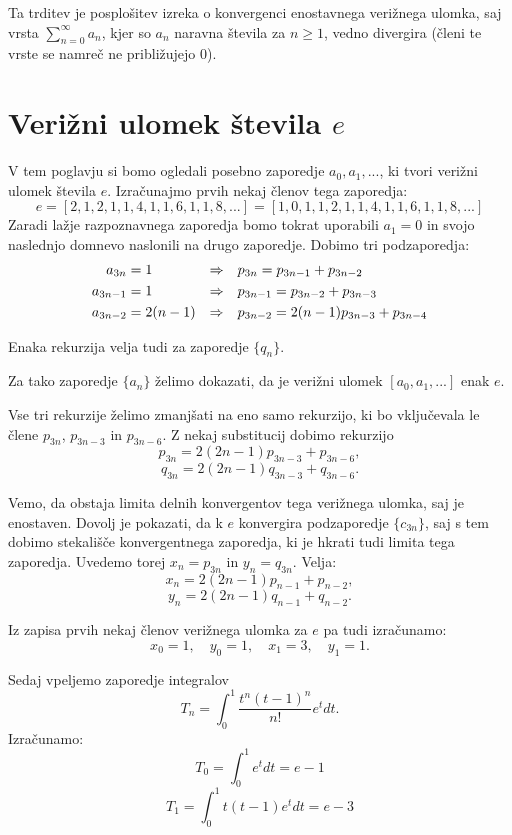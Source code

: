 \documentclass[a4paper,12pt]{article}
\theoremstyle{definition}
\theoremstyle{proposition}
\theoremstyle{theorem}
\theoremstyle{lemma}
\begin{document}
Ta trditev je posplošitev izreka o konvergenci enostavnega verižnega ulomka, saj vrsta $\sum_{n=0}^{\infty}a_n$, kjer so $a_n$ naravna števila za $n \geq 1$, vedno divergira (členi te vrste se namreč ne približujejo $0$).

\section{Verižni ulomek števila $e$} \label{euler}

V tem poglavju si bomo ogledali posebno zaporedje $a_0,a_1,...$, ki tvori verižni ulomek števila $e$. Izračunajmo prvih nekaj členov tega zaporedja:
\[e = [2, 1, 2, 1, 1, 4, 1, 1, 6, 1, 1, 8, ...] = [1, 0, 1, 1, 2, 1, 1, 4, 1, 1, 6, 1, 1, 8, ...] \]
Zaradi lažje razpoznavnega zaporedja bomo tokrat uporabili $a_1=0$ in svojo naslednjo domnevo naslonili na drugo zaporedje. Dobimo tri podzaporedja:
\begin{align*}
a_{3n} &= 1 &\Rightarrow \quad & p_{3n} = p_{3n-1}+p_{3n-2} \hfill \\
a_{3n-1} &= 1 &\Rightarrow \quad & p_{3n-1} = p_{3n-2}+p_{3n-3} \hfill \\
a_{3n-2} &= 2(n-1) &\Rightarrow \quad & p_{3n-2} = 2(n-1)p_{3n-3}+p_{3n-4} \hfill \\
\end{align*}

Enaka rekurzija velja tudi za zaporedje $\{q_n\}$.\par
Za tako zaporedje $\{a_n\}$ želimo dokazati, da je verižni ulomek $[a_0, a_1,...]$ enak $e$.\par Vse tri rekurzije želimo zmanjšati na eno samo rekurzijo, ki bo vključevala le člene $p_{3n}$, $p_{3n-3}$ in $p_{3n-6}$. Z nekaj substitucij dobimo rekurzijo
\[ p_{3n} = 2(2n-1)p_{3n-3}+p_{3n-6}, \]
\[ q_{3n} = 2(2n-1)q_{3n-3}+q_{3n-6}. \]

Vemo, da obstaja limita delnih konvergentov tega verižnega ulomka, saj je enostaven. Dovolj je pokazati, da k $e$ konvergira podzaporedje $\{c_{3n}\}$, saj s tem dobimo stekališče konvergentnega zaporedja, ki je hkrati tudi limita tega zaporedja. Uvedemo torej $x_n = p_{3n}$ in $y_n = q_{3n}$. Velja:
\[ x_n = 2(2n-1)p_{n-1}+p_{n-2}, \]
\[ y_n = 2(2n-1)q_{n-1}+q_{n-2}. \]

Iz zapisa prvih nekaj členov verižnega ulomka za $e$ pa tudi izračunamo:
\[ x_0 = 1,\quad y_0=1,\quad x_1=3,\quad y_1=1.\]

Sedaj vpeljemo zaporedje integralov $$T_n = \int_{0}^{1}\frac{t^n(t-1)^n}{n!}e^t dt.$$
Izračunamo:
$$T_0 = \int_{0}^{1}e^t dt = e -1$$
$$T_1 = \int_{0}^{1}t(t-1)e^t dt=e-3$$
\end{document}
